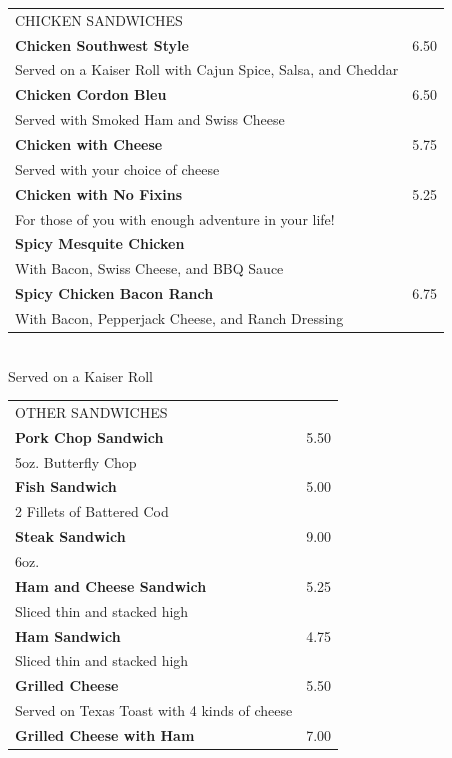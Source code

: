 \documentclass[10pt,notitlepage]{article}
\makeatletter
\newcommand*\ColText[1]{\uppercase{#1}}
\newenvironment{Group}[1]
	{\noindent\begin{tabular*}{\textwidth}{@{}p{.8\linewidth}@{\extracolsep{\fill}}r@{}}
		{\fontsize{16}{20}\selectfont\ColText{#1}}\\[0.8em]}
	{\end{tabular*}}
\newcommand*\Item[2]{%
	\sffamily\textbf{#1}\dotfill & #2}
\newcommand*\Desc[1]{%
	\sffamily\hspace*{1em}\small #1}
\makeatother
\begin{document}
	\vfill{}
	
	\begin{Group}{Chicken Sandwiches}
		\Item{Chicken Southwest Style}{6.50} \\
		\Desc{Served on a Kaiser Roll with Cajun Spice, Salsa, and Cheddar} \\
		\Item{Chicken Cordon Bleu}{6.50} \\
		\Desc{Served with Smoked Ham and Swiss Cheese} \\
		\Item{Chicken with Cheese}{5.75} \\
		\Desc{Served with your choice of cheese} \\
		\Item{Chicken with No Fixins}{5.25} \\
		\Desc{For those of you with enough adventure in your life!} \\
		\Item{Spicy Mesquite Chicken} \\
		\Desc{With Bacon, Swiss Cheese, and BBQ Sauce} \\
		\Item{Spicy Chicken Bacon Ranch}{6.75} \\
		\Desc{With Bacon, Pepperjack Cheese, and Ranch Dressing} \\
	\end{Group}
	\\[\baselineskip]
	\centering Served on a Kaiser Roll \\
	
	\vfill{}
	
	\begin{Group}{Other Sandwiches}
		\Item{Pork Chop Sandwich}{5.50} \\
		\Desc{5oz. Butterfly Chop} \\
		\Item{Fish Sandwich}{5.00} \\
		\Desc{2 Fillets of Battered Cod} \\
		\Item{Steak Sandwich}{9.00} \\
		\Desc{6oz.} \\
		\Item{Ham and Cheese Sandwich}{5.25} \\
		\Desc{Sliced thin and stacked high} \\
		\Item{Ham Sandwich}{4.75} \\
		\Desc{Sliced thin and stacked high} \\
		\Item{Grilled Cheese}{5.50} \\
		\Desc{Served on Texas Toast with 4 kinds of cheese} \\
		\Item{Grilled Cheese with Ham}{7.00} \\
	\end{Group}
	
\end{document}
